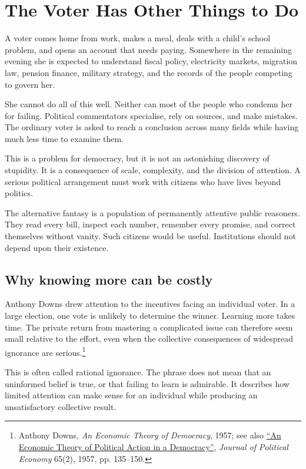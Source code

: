 \documentclass[12pt,a4paper]{book}
\begin{document}
\chapter{The Voter Has Other Things to Do}

A voter comes home from work, makes a meal, deals with a child's school problem, and opens an account that needs paying. Somewhere in the remaining evening she is expected to understand fiscal policy, electricity markets, migration law, pension finance, military strategy, and the records of the people competing to govern her.

She cannot do all of this well. Neither can most of the people who condemn her for failing. Political commentators specialise, rely on sources, and make mistakes. The ordinary voter is asked to reach a conclusion across many fields while having much less time to examine them.

This is a problem for democracy, but it is not an astonishing discovery of stupidity. It is a consequence of scale, complexity, and the division of attention. A serious political arrangement must work with citizens who have lives beyond politics.

The alternative fantasy is a population of permanently attentive public reasoners. They read every bill, inspect each number, remember every promise, and correct themselves without vanity. Such citizens would be useful. Institutions should not depend upon their existence.

\section*{Why knowing more can be costly}

Anthony Downs drew attention to the incentives facing an individual voter. In a large election, one vote is unlikely to determine the winner. Learning more takes time. The private return from mastering a complicated issue can therefore seem small relative to the effort, even when the collective consequences of widespread ignorance are serious.\footnote{Anthony Downs, \emph{An Economic Theory of Democracy}, 1957; see also \href{https://doi.org/10.1086/257897}{``An Economic Theory of Political Action in a Democracy''}, \emph{Journal of Political Economy} 65(2), 1957, pp. 135--150.}

This is often called rational ignorance. The phrase does not mean that an uninformed belief is true, or that failing to learn is admirable. It describes how limited attention can make sense for an individual while producing an unsatisfactory collective result.
\end{document}

